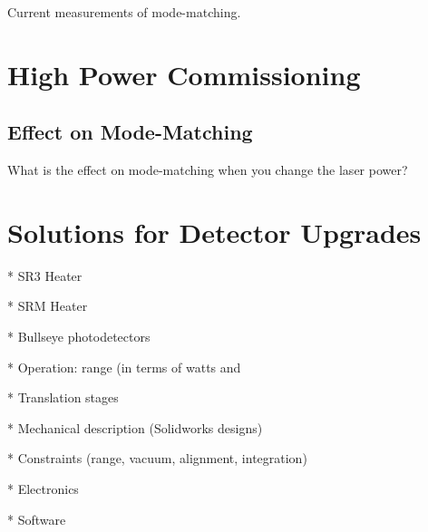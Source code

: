 \documentclass[10pt,a4paper]{book}
\begin{document}
	Current measurements of mode-matching.

\chapter{High Power Commissioning}
	\section{Effect on Mode-Matching}
	What is the effect on mode-matching when you change the laser power?

\chapter{Solutions for Detector Upgrades}

* SR3 Heater

* SRM Heater

* Bullseye photodetectors

* Operation: range (in terms of watts and %

* Translation stages

* Mechanical description (Solidworks designs)

* Constraints (range, vacuum, alignment, integration)

* Electronics 

* Software


	\listoffigures
	\listoftables
\end{document}
